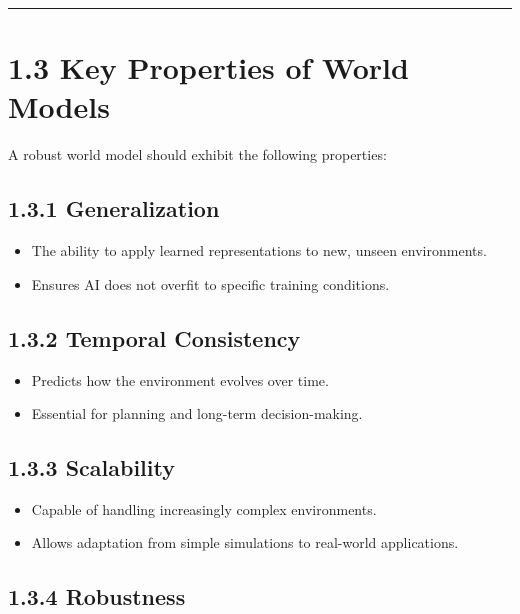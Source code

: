\documentclass[
]{book}
\providecommand{\tightlist}{%
  \setlength{\itemsep}{0pt}\setlength{\parskip}{0pt}}
\begin{document}
\begin{center}\rule{0.5\linewidth}{0.5pt}\end{center}

\section{1.3 Key Properties of World Models}\label{key-properties-of-world-models}

A robust world model should exhibit the following properties:

\subsection{1.3.1 Generalization}\label{generalization}

\begin{itemize}
\tightlist
\item
  The ability to apply learned representations to new, unseen environments.
\item
  Ensures AI does not overfit to specific training conditions.
\end{itemize}

\subsection{1.3.2 Temporal Consistency}\label{temporal-consistency}

\begin{itemize}
\tightlist
\item
  Predicts how the environment evolves over time.
\item
  Essential for planning and long-term decision-making.
\end{itemize}

\subsection{1.3.3 Scalability}\label{scalability}

\begin{itemize}
\tightlist
\item
  Capable of handling increasingly complex environments.
\item
  Allows adaptation from simple simulations to real-world applications.
\end{itemize}

\subsection{1.3.4 Robustness}\label{robustness}
\end{document}
